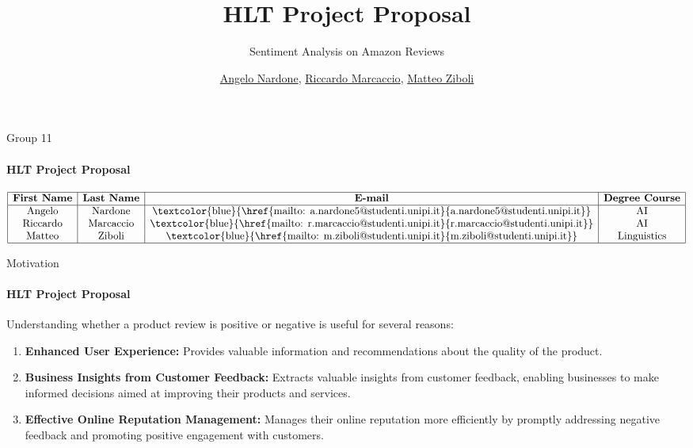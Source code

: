 \documentclass{beamer}
\title{HLT Project Proposal}
\subtitle{Sentiment Analysis on Amazon Reviews}
\author{\href{mailto:a.nardone5@studenti.unipi.it}{Angelo Nardone}, \href{mailto:r.marcaccio@studenti.unipi.it}{Riccardo Marcaccio}, \href{mailto: m.ziboli@studenti.unipi.it}{Matteo Ziboli}}
\date{}
\theoremstyle{definition}
\theoremstyle{plain}
\begin{document}
\maketitle


\begin{frame}{Group 11}
\framesubtitle{HLT Project Proposal}

\[
\begin{array}{|c | c | c | c|}
    \hline
    \textbf{First Name} & \textbf{Last Name} & \textbf{E-mail} & \textbf{Degree Course} \\
    \hline
    \text{Angelo} & \text{Nardone} & \text{\textcolor{blue}{\href{mailto: a.nardone5@studenti.unipi.it}{a.nardone5@studenti.unipi.it}}} & \text{AI} \\
    \text{Riccardo} &  \text{Marcaccio} &	\text{\textcolor{blue}{\href{mailto: r.marcaccio@studenti.unipi.it}{r.marcaccio@studenti.unipi.it}}}	& \text{AI} \\
    \text{Matteo} & \text{Ziboli} &	\text{\textcolor{blue}{\href{mailto: m.ziboli@studenti.unipi.it}{m.ziboli@studenti.unipi.it}}} & \text{Linguistics} \\
    \hline
\end{array}
\]
\end{frame}

\begin{frame}{Motivation}
\framesubtitle{HLT Project Proposal}
{\small
Understanding whether a product review is positive or negative is useful for several reasons:
\begin{enumerate}
    \item \textbf{Enhanced User Experience:} Provides valuable information and recommendations about the quality of the product.

    \item \textbf{Business Insights from Customer Feedback:} Extracts valuable insights from customer feedback, enabling businesses to make informed decisions aimed at improving their products and services.

    \item \textbf{Effective Online Reputation Management:} Manages their online reputation more efficiently by promptly addressing negative feedback and promoting positive engagement with customers.
\end{enumerate}
}
\end{frame}
\end{document}
